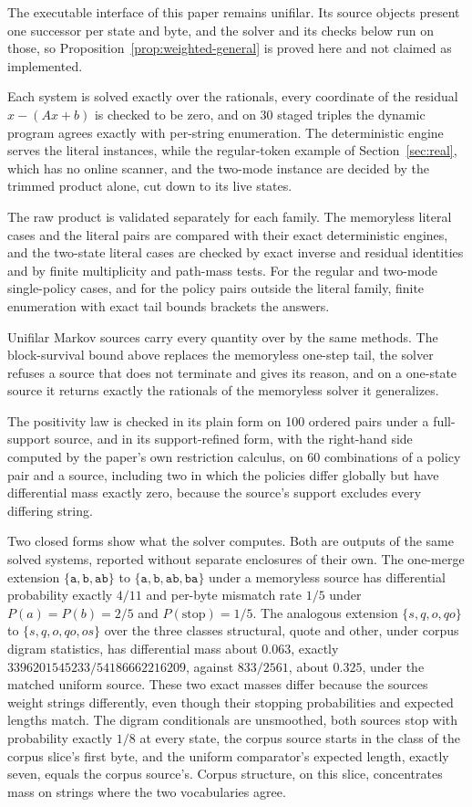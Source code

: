 \documentclass[11pt,a4paper]{article}
\theoremstyle{definition}
\theoremstyle{plain}
\newcommand{\code}[1]{\texttt{#1}}
\begin{document}
The executable interface of this paper remains unifilar. Its source objects present one successor per state and byte,
and the solver and its checks below run on those, so Proposition~\ref{prop:weighted-general} is proved here and not
claimed as implemented.


Each system is solved exactly over the rationals, every coordinate of the residual $x - (Ax + b)$ is checked to be zero,
and on 30 staged triples the dynamic program agrees exactly with per-string enumeration. The deterministic engine serves
the literal instances, while the regular-token example of Section~\ref{sec:real}, which has no online scanner, and the
two-mode instance are decided by the trimmed product alone, cut down to its live states.

The raw product is validated separately for each family. The memoryless literal cases and the literal pairs are compared
with their exact deterministic engines, and the two-state literal cases are checked by exact inverse and residual
identities and by finite multiplicity and path-mass tests. For the regular and two-mode single-policy cases, and for the
policy pairs outside the literal family, finite enumeration with exact tail bounds brackets the answers.

Unifilar Markov sources carry every quantity over by the same methods. The block-survival bound above replaces the
memoryless one-step tail, the solver refuses a source that does not terminate and gives its reason, and on a one-state
source it returns exactly the rationals of the memoryless solver it generalizes.

The positivity law is checked in its plain form on 100 ordered pairs under a full-support source, and in its
support-refined form, with the right-hand side computed by the paper's own restriction calculus, on 60 combinations of a
policy pair and a source, including two in which the policies differ globally but have differential mass exactly zero,
because the source's support excludes every differing string.

Two closed forms show what the solver computes. Both are outputs of the same solved systems, reported without separate
enclosures of their own. The one-merge extension $\{\code{a}, \code{b}, \code{ab}\}$ to
$\{\code{a}, \code{b}, \code{ab}, \code{ba}\}$ under a memoryless source has differential probability exactly $4/11$ and
per-byte mismatch rate $1/5$ under $P(a) = P(b) = 2/5$ and $P(\mathrm{stop}) = 1/5$. The analogous extension
$\{s, q, o, qo\}$ to $\{s, q, o, qo, os\}$ over the three classes structural, quote and other, under corpus digram
statistics, has differential mass about $0.063$, exactly $3396201545233/54186662216209$, against $833/2561$, about
$0.325$, under the matched uniform source. These two exact masses differ because the sources weight strings differently,
even though their stopping probabilities and expected lengths match. The digram conditionals are unsmoothed, both
sources stop with probability exactly $1/8$ at every state, the corpus source starts in the class of the corpus slice's
first byte, and the uniform comparator's expected length, exactly seven, equals the corpus source's. Corpus structure,
on this slice, concentrates mass on strings where the two vocabularies agree.
\end{document}
